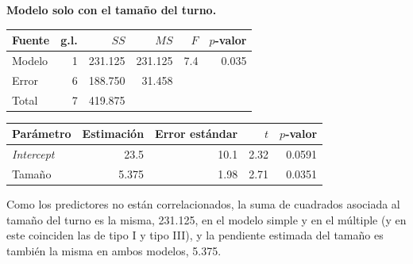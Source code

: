 \begin{ejemplo}
  \textbf{Modelo solo con el tamaño del turno.}
  \begin{center}
    \small
    \renewcommand{\arraystretch}{1.15}
    \begin{tabular}{lrrrrr}
      \toprule
      Fuente & g.l. & $SS$ & $MS$ & $F$ & $p$-valor \\
      \midrule
      Modelo & 1 & 231.125 & 231.125 & 7.4 & 0.035 \\
      Error & 6 & 188.750 & 31.458 & & \\
      Total & 7 & 419.875 & & & \\
      \bottomrule
    \end{tabular}
    \qquad
    \begin{tabular}{lrrrr}
      \toprule
      Parámetro & Estimación & Error estándar & $t$ & $p$-valor \\
      \midrule
      \emph{Intercept} & 23.5 & 10.1 & 2.32 & 0.0591 \\
      Tamaño & 5.375 & 1.98 & 2.71 & 0.0351 \\
      \bottomrule
    \end{tabular}
  \end{center}
  Como los predictores no están correlacionados, la suma de cuadrados asociada al tamaño del turno
  es la misma, 231.125, en el modelo simple y en el múltiple (y en este coinciden las de tipo I y
  tipo III), y la pendiente estimada del tamaño es también la misma en ambos modelos, 5.375.
\end{ejemplo}

